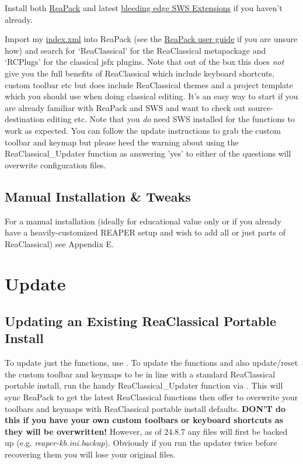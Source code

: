 \documentclass[10pt,american]{article}
\begin{document}
Install both \href{https://reapack.com/}{ReaPack} and latest
\href{https://www.sws-extension.org/download/pre-release/}{bleeding edge SWS
Extensions} if you haven't already. 

Import my
\href{https://github.com/chmaha/ReaClassical/raw/main/index.xml}{index.xml} into
ReaPack (see the
\href{https://reapack.com/user-guide\#import-repositories}{ReaPack user guide}
if you are unsure how) and search for `ReaClassical' for the ReaClassical
metapackage and `RCPlugs' for the classical jsfx plugins. Note that out of the
box this does \emph{not} give you the full benefits of ReaClassical which
include keyboard shortcuts, custom toolbar etc but does include ReaClassical
themes and a project template which you should use when doing classical editing.
It's an easy way to start if you are already familiar with ReaPack and SWS and
want to check out source-destination editing etc. Note that you \emph{do} need
SWS installed for the functions to work as expected. You can follow the update
instructions  to grab the custom toolbar and keymap
but please heed the warning about using the ReaClassical\_Updater function as
answering 'yes' to either of the questions will overwrite configuration files.

\subsection{Manual Installation \& Tweaks}

\noindent For a manual installation (ideally for educational value only or if
you already have a heavily-customized REAPER setup and wish to add all or just
parts of ReaClassical) see Appendix E.

\section{Update}

\subsection{\label{subsec:Updating}Updating an Existing ReaClassical Portable
Install}

To update just the functions, use . To update the functions and also update/reset the custom toolbar and
keymaps to be in line with a standard ReaClassical portable install, run the
handy ReaClassical\_Updater function via  . This will sync
ReaPack to get the latest ReaClassical functions then offer to overwrite your
toolbars and keymaps with ReaClassical portable install defaults. \textbf{DON'T
do this if you have your own custom toolbars or keyboard shortcuts as they will
be overwritten! }However, as of 24.8.7 any files will first be backed up (e.g.
\emph{reaper-kb.ini.backup}). Obviously if you run the updater twice before
recovering them you will lose your original files.
\end{document}
